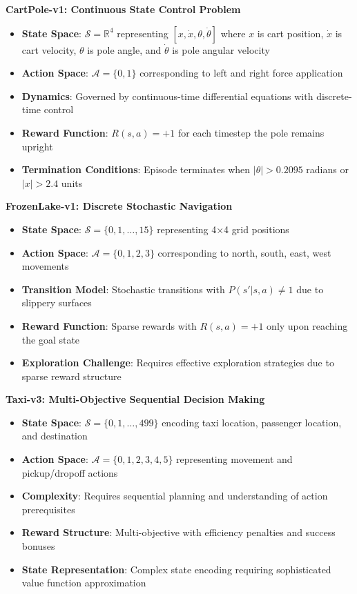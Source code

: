 \documentclass[12pt]{article}
\begin{document}
{{{\textbf{CartPole-v1: Continuous State Control Problem}
\begin{itemize}
    \item \textbf{State Space}: $\mathcal{S} = \mathbb{R}^4$ representing $[x, \dot{x}, \theta, \dot{\theta}]$ where $x$ is cart position, $\dot{x}$ is cart velocity, $\theta$ is pole angle, and $\dot{\theta}$ is pole angular velocity
    \item \textbf{Action Space}: $\mathcal{A} = \{0, 1\}$ corresponding to left and right force application
    \item \textbf{Dynamics}: Governed by continuous-time differential equations with discrete-time control
    \item \textbf{Reward Function}: $R(s,a) = +1$ for each timestep the pole remains upright
    \item \textbf{Termination Conditions}: Episode terminates when $|\theta| > 0.2095$ radians or $|x| > 2.4$ units
\end{itemize}

\textbf{FrozenLake-v1: Discrete Stochastic Navigation}
\begin{itemize}
    \item \textbf{State Space}: $\mathcal{S} = \{0, 1, \ldots, 15\}$ representing 4×4 grid positions
    \item \textbf{Action Space}: $\mathcal{A} = \{0, 1, 2, 3\}$ corresponding to north, south, east, west movements
    \item \textbf{Transition Model}: Stochastic transitions with $P(s'|s,a) \neq 1$ due to slippery surfaces
    \item \textbf{Reward Function}: Sparse rewards with $R(s,a) = +1$ only upon reaching the goal state
    \item \textbf{Exploration Challenge}: Requires effective exploration strategies due to sparse reward structure
\end{itemize}

\textbf{Taxi-v3: Multi-Objective Sequential Decision Making}
\begin{itemize}
    \item \textbf{State Space}: $\mathcal{S} = \{0, 1, \ldots, 499\}$ encoding taxi location, passenger location, and destination
    \item \textbf{Action Space}: $\mathcal{A} = \{0, 1, 2, 3, 4, 5\}$ representing movement and pickup/dropoff actions
    \item \textbf{Complexity}: Requires sequential planning and understanding of action prerequisites
    \item \textbf{Reward Structure}: Multi-objective with efficiency penalties and success bonuses
    \item \textbf{State Representation}: Complex state encoding requiring sophisticated value function approximation
\end{itemize}

}}}
\end{document}
